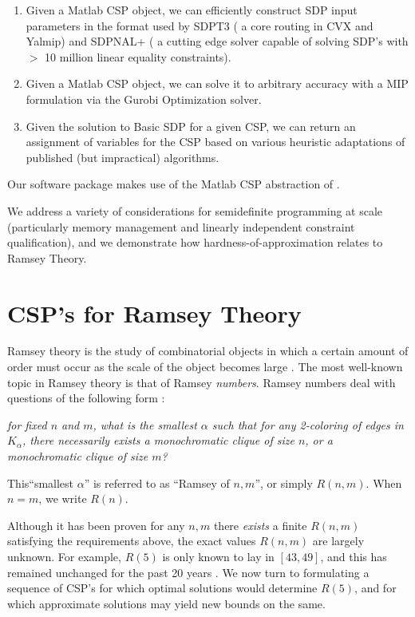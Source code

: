 \documentclass[12pt]{article} %
\begin{document}
\begin{enumerate}
\item Given a Matlab CSP object, we can efficiently construct SDP input parameters in the format used by SDPT3 ( a core routing in CVX and Yalmip) and SDPNAL+ ( a cutting edge solver capable of solving SDP's with $>$ 10 million linear equality constraints).

\item Given a Matlab CSP object, we can solve it to arbitrary accuracy with a MIP formulation via the Gurobi Optimization solver.

\item Given the solution to Basic SDP for a given CSP, we can return an assignment of variables for the CSP based on various heuristic adaptations of published (but impractical) algorithms.
\end{enumerate}
Our software package makes use of the Matlab CSP abstraction of \cite{dwivedi2015introduction}.

We address a variety of considerations for semidefinite programming at scale (particularly memory management and linearly independent constraint qualification), and we demonstrate how hardness-of-approximation relates to Ramsey Theory.


\section{CSP's for Ramsey Theory}
Ramsey theory is the study of combinatorial objects in which a certain amount of order must occur as the scale of the object becomes large \cite{rt}. The most well-known topic in Ramsey theory is that of Ramsey \textit{numbers}. Ramsey numbers deal with questions of the following form : 

\vspace{1em}
\noindent \textit{for fixed $n$ and $m$, what is the smallest $\alpha$ such that for \textit{any} 2-coloring of edges in $K_\alpha$, there necessarily exists a monochromatic clique of size $n$, or a monochromatic clique of size $m$?}
\vspace{1em}

This``smallest $\alpha$'' is referred to as ``Ramsey of $n,m$'', or simply $R(n,m)$. When $n = m$, we write $R(n)$.

Although it has been proven for any $n,m$ there \textit{exists} a finite $R(n,m)$ satisfying the requirements above, the exact values $R(n,m)$ are largely unknown. For example, $R(5)$ is only known to lay in $[43,49]$, and this has remained unchanged for the past 20 years \cite{rn}. We now turn to formulating a sequence of CSP's for which optimal solutions would determine $R(5)$, and for which approximate solutions may yield new bounds on the same.
\end{document}
